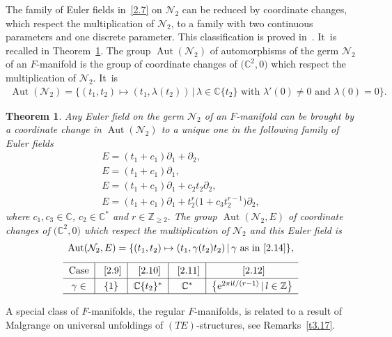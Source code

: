 \documentclass[pdftex]{sigma}%
\numberwithin{equation}{section}
\numberwithin{figure}{section}
\newcommand{\Z}{{\mathbb Z}}
\newcommand{\C}{{\mathbb C}}
\newcommand{\NN}{{\mathcal N}}
\newcommand{\paa}{\partial}
\DeclareMathOperator{\Aut}{Aut}
\newtheorem{Theorem}{Theorem}[section]
\begin{document}
The family of Euler fields in~\eqref{2.7} on $\NN_2$
can be reduced by coordinate changes, which respect the
multiplication of $\NN_2$, to a family
with two continuous parameters and one discrete parameter.
This classification is proved in~\cite{DH20-3}. It~is recalled
in Theorem~\ref{t2.3}.
The group $\Aut(\NN_2)$ of automorphisms of the germ
$\NN_2$ of an $F$-manifold is the group of coordinate
changes of $\big(\C^2,0\big)$ which respect the multiplication
of $\NN_2$. It~is
\begin{gather*}%
\Aut(\NN_2)=\{(t_1,t_2)\mapsto(t_1,\lambda(t_2))\,|\,
\lambda\in \C\{t_2\}\text{ with }\lambda'(0)\neq 0\text{ and }\lambda(0)=0\}.
\end{gather*}

\begin{Theorem}\label{t2.3}
Any Euler field on the germ $\NN_2$ of an $F$-manifold
can be brought by a coordinate change in $\Aut(\NN_2)$
to a unique one in the following family of Euler fields
\begin{gather}\label{2.9}
E = (t_{1} + c_1) \paa_{1} +\paa_{2},
\\
E = (t_{1}+c_1) \paa_{1},\label{2.10}
\\
E = (t_{1}+c_1) \paa_{1} +{c}_2 t_{2}\paa_{2},\label{2.11}
\\
E = (t_{1}+c_1) \paa_{1} + t_{2}^{r}\big(1 + c_3 t_{2}^{r-1}\big)\paa_{2},\label{2.12}
\end{gather}
where $c_1, c_3\in \C$, $c_2\in \C^*$ and $r\in
\Z_{\geq 2}.$
The group $\Aut(\NN_2,E)$ of coordinate changes of
$\big(\C^2,0\big)$ which respect the multiplication of $\NN_2$
and this Euler field is
\begin{gather}%
\Aut(\NN_2,E)=\{(t_1,t_2)\mapsto (t_1,\gamma(t_2)t_2)\,|\,
\gamma\text{ as in~\eqref{2.14}}\},\nonumber
\\[1ex]
\def\arraystretch{1.3}
\begin{tabular}{c|c|c|c|c}
\hline
\text{Case} &~\eqref{2.9} &~\eqref{2.10} &~\eqref{2.11}&~\eqref{2.12}
\\ \hline
$\gamma\in$ & \{1\} & $\C\{t_2\}^*$ & $\C^*$
&$\big\{{\rm e}^{2\pi {\rm i} l/(r-1)}\,|\, l\in\Z \big\}$\label{2.14}
\\
\hline
\end{tabular}
\end{gather}
\end{Theorem}



A special class of $F$-manifolds, the regular $F$-manifolds,
is related to a result of Malgrange on universal unfoldings
of $(TE)$-structures, see Remarks~\ref{t3.17}.
\end{document}

